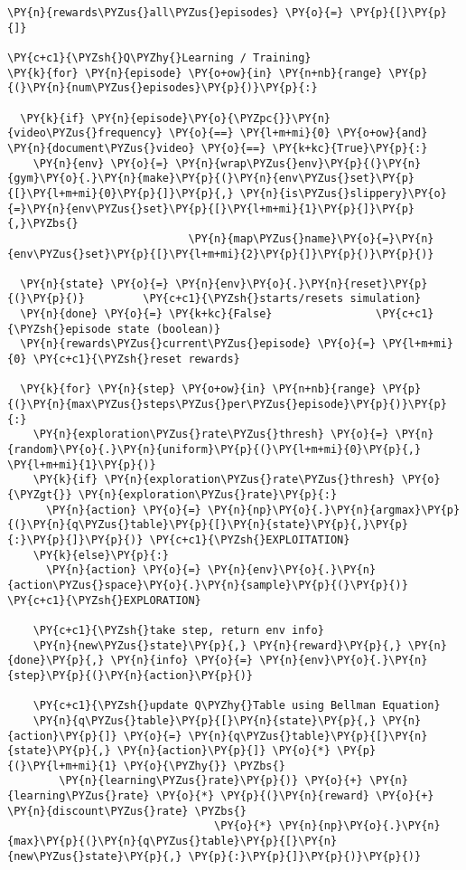 \begin{tcolorbox}[breakable, size=fbox, boxrule=1pt, pad at break*=1mm,colback=cellbackground, colframe=cellborder]
\begin{Verbatim}[commandchars=\\\{\}]
\PY{n}{rewards\PYZus{}all\PYZus{}episodes} \PY{o}{=} \PY{p}{[}\PY{p}{]}

\PY{c+c1}{\PYZsh{}Q\PYZhy{}Learning / Training}
\PY{k}{for} \PY{n}{episode} \PY{o+ow}{in} \PY{n+nb}{range} \PY{p}{(}\PY{n}{num\PYZus{}episodes}\PY{p}{)}\PY{p}{:}

  \PY{k}{if} \PY{n}{episode}\PY{o}{\PYZpc{}}\PY{n}{video\PYZus{}frequency} \PY{o}{==} \PY{l+m+mi}{0} \PY{o+ow}{and} \PY{n}{document\PYZus{}video} \PY{o}{==} \PY{k+kc}{True}\PY{p}{:}
    \PY{n}{env} \PY{o}{=} \PY{n}{wrap\PYZus{}env}\PY{p}{(}\PY{n}{gym}\PY{o}{.}\PY{n}{make}\PY{p}{(}\PY{n}{env\PYZus{}set}\PY{p}{[}\PY{l+m+mi}{0}\PY{p}{]}\PY{p}{,} \PY{n}{is\PYZus{}slippery}\PY{o}{=}\PY{n}{env\PYZus{}set}\PY{p}{[}\PY{l+m+mi}{1}\PY{p}{]}\PY{p}{,}\PYZbs{}
                            \PY{n}{map\PYZus{}name}\PY{o}{=}\PY{n}{env\PYZus{}set}\PY{p}{[}\PY{l+m+mi}{2}\PY{p}{]}\PY{p}{)}\PY{p}{)}
  
  \PY{n}{state} \PY{o}{=} \PY{n}{env}\PY{o}{.}\PY{n}{reset}\PY{p}{(}\PY{p}{)}         \PY{c+c1}{\PYZsh{}starts/resets simulation}
  \PY{n}{done} \PY{o}{=} \PY{k+kc}{False}                \PY{c+c1}{\PYZsh{}episode state (boolean)}
  \PY{n}{rewards\PYZus{}current\PYZus{}episode} \PY{o}{=} \PY{l+m+mi}{0} \PY{c+c1}{\PYZsh{}reset rewards}

  \PY{k}{for} \PY{n}{step} \PY{o+ow}{in} \PY{n+nb}{range} \PY{p}{(}\PY{n}{max\PYZus{}steps\PYZus{}per\PYZus{}episode}\PY{p}{)}\PY{p}{:}
    \PY{n}{exploration\PYZus{}rate\PYZus{}thresh} \PY{o}{=} \PY{n}{random}\PY{o}{.}\PY{n}{uniform}\PY{p}{(}\PY{l+m+mi}{0}\PY{p}{,} \PY{l+m+mi}{1}\PY{p}{)}
    \PY{k}{if} \PY{n}{exploration\PYZus{}rate\PYZus{}thresh} \PY{o}{\PYZgt{}} \PY{n}{exploration\PYZus{}rate}\PY{p}{:}
      \PY{n}{action} \PY{o}{=} \PY{n}{np}\PY{o}{.}\PY{n}{argmax}\PY{p}{(}\PY{n}{q\PYZus{}table}\PY{p}{[}\PY{n}{state}\PY{p}{,}\PY{p}{:}\PY{p}{]}\PY{p}{)} \PY{c+c1}{\PYZsh{}EXPLOITATION}
    \PY{k}{else}\PY{p}{:}
      \PY{n}{action} \PY{o}{=} \PY{n}{env}\PY{o}{.}\PY{n}{action\PYZus{}space}\PY{o}{.}\PY{n}{sample}\PY{p}{(}\PY{p}{)}   \PY{c+c1}{\PYZsh{}EXPLORATION}

    \PY{c+c1}{\PYZsh{}take step, return env info}
    \PY{n}{new\PYZus{}state}\PY{p}{,} \PY{n}{reward}\PY{p}{,} \PY{n}{done}\PY{p}{,} \PY{n}{info} \PY{o}{=} \PY{n}{env}\PY{o}{.}\PY{n}{step}\PY{p}{(}\PY{n}{action}\PY{p}{)} 

    \PY{c+c1}{\PYZsh{}update Q\PYZhy{}Table using Bellman Equation}
    \PY{n}{q\PYZus{}table}\PY{p}{[}\PY{n}{state}\PY{p}{,} \PY{n}{action}\PY{p}{]} \PY{o}{=} \PY{n}{q\PYZus{}table}\PY{p}{[}\PY{n}{state}\PY{p}{,} \PY{n}{action}\PY{p}{]} \PY{o}{*} \PY{p}{(}\PY{l+m+mi}{1} \PY{o}{\PYZhy{}} \PYZbs{}
        \PY{n}{learning\PYZus{}rate}\PY{p}{)} \PY{o}{+} \PY{n}{learning\PYZus{}rate} \PY{o}{*} \PY{p}{(}\PY{n}{reward} \PY{o}{+} \PY{n}{discount\PYZus{}rate} \PYZbs{}
                                \PY{o}{*} \PY{n}{np}\PY{o}{.}\PY{n}{max}\PY{p}{(}\PY{n}{q\PYZus{}table}\PY{p}{[}\PY{n}{new\PYZus{}state}\PY{p}{,} \PY{p}{:}\PY{p}{]}\PY{p}{)}\PY{p}{)} 


\end{Verbatim}
\end{tcolorbox}
